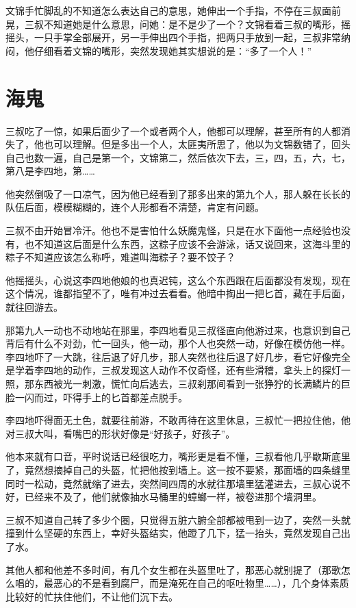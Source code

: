 文锦手忙脚乱的不知道怎么表达自己的意思，她伸出一个手指，不停在三叔面前晃，三叔不知道她是什么意思，问她：是不是少了一个？文锦看着三叔的嘴形，摇摇头，一只手掌全部展开，另一手伸出四个手指，把两只手放到一起，三叔非常纳闷，他仔细看着文锦的嘴形，突然发现她其实想说的是：“多了一个人！”

\chapter{海鬼}

三叔吃了一惊，如果后面少了一个或者两个人，他都可以理解，甚至所有的人都消失了，他也可以理解。但是多出一个人，太匪夷所思了，他以为文锦数错了，回头自己也数一遍，自己是第一个，文锦第二，然后依次下去，三，四，五，六，七，第八是李四地，第……

他突然倒吸了一口凉气，因为他已经看到了那多出来的第九个人，那人躲在长长的队伍后面，模模糊糊的，连个人形都看不清楚，肯定有问题。

三叔不由开始冒冷汗。他也不是害怕什么妖魔鬼怪，只是在水下面他一点经验也没有，也不知道这后面是什么东西，这粽子应该不会游泳，话又说回来，这海斗里的粽子不知道应该怎么称呼，难道叫海粽子？要不饺子？

他摇摇头，心说这李四地他娘的也真迟钝，这么个东西跟在后面都没有发现，现在这个情况，谁都指望不了，唯有冲过去看看。他暗中掏出一把匕首，藏在手后面，就往回游去。

那第九人一动也不动地站在那里，李四地看见三叔径直向他游过来，也意识到自己背后有什么不对劲，忙一回头，他一动，那个人也突然一动，好像在模仿他一样。李四地吓了一大跳，往后退了好几步，那人突然也往后退了好几步，看它好像完全是学着李四地的动作，三叔发现这人动作不仅奇怪，还有些滑稽，拿头上的探灯一照，那东西被光一刺激，慌忙向后逃去，三叔刹那间看到一张狰狞的长满鳞片的巨脸一闪而过，吓得手上的匕首都差点脱手。

李四地吓得面无土色，就要往前游，不敢再待在这里休息，三叔忙一把拉住他，他对三叔大叫，看嘴巴的形状好像是“好孩子，好孩子”。

他本来就有口音，平时说话已经很吃力，嘴形更是看不懂，三叔看他几乎歇斯底里了，竟然想摘掉自己的头盔，忙把他按到墙上。这一按不要紧，那面墙的四条缝里同时一松动，竟然就缩了进去，突然间四周的水就往那墙里猛灌进去，三叔心说不好，已经来不及了，他们就像抽水马桶里的蟑螂一样，被卷进那个墙洞里。

三叔不知道自己转了多少个圈，只觉得五脏六腑全部都被甩到一边了，突然一头就撞到什么坚硬的东西上，幸好头盔结实，他蹬了几下，猛一抬头，竟然发现自己出了水。

其他人都和他差不多时间，有几个女生都在头盔里吐了，那恶心就别提了（那歌怎么唱的，最恶心的不是看到腐尸，而是淹死在自己的呕吐物里……），几个身体素质比较好的忙扶住他们，不让他们沉下去。

